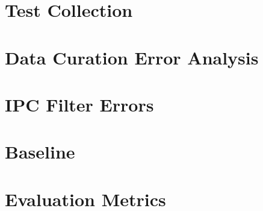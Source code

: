 \section{Test Collection}
\section{Data Curation Error Analysis}
\section{IPC Filter Errors}
\section{Baseline}
\section{Evaluation Metrics}





